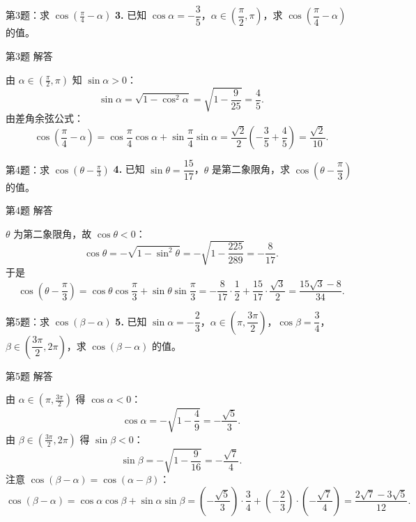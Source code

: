 \documentclass[10pt,aspectratio=169,serif]{beamer}
\begin{document}
\begin{frame}[t]{第3题：求 $\cos\!\left(\frac{\pi}{4}-\alpha\right)$}
\textbf{3.} 已知 $\cos\alpha=-\dfrac{3}{5}$，$\alpha\in\left(\dfrac{\pi}{2},\pi\right)$，求 $\cos\!\left(\dfrac{\pi}{4}-\alpha\right)$ 的值。
\end{frame}

\begin{frame}[t]{第3题 解答}
\begin{tcolorbox}[colback=orange!10,colframe=orange,title=\textbf{解}]
由 $\alpha\in(\frac{\pi}{2},\pi)$ 知 $\sin\alpha>0$：
\[
\sin\alpha=\sqrt{1-\cos^2\alpha}=\sqrt{1-\frac{9}{25}}=\frac45.
\]
由差角余弦公式：
\[
\cos\!\left(\frac{\pi}{4}-\alpha\right)
=\cos\frac{\pi}{4}\cos\alpha+\sin\frac{\pi}{4}\sin\alpha
=\frac{\sqrt2}{2}\!\left(-\frac35+\frac45\right)=\frac{\sqrt2}{10}.
\]
\end{tcolorbox}
\end{frame}

\begin{frame}[t]{第4题：求 $\cos\!\left(\theta-\frac{\pi}{3}\right)$}
\textbf{4.} 已知 $\sin\theta=\dfrac{15}{17}$，$\theta$ 是第二象限角，求 $\cos\!\left(\theta-\dfrac{\pi}{3}\right)$ 的值。
\end{frame}

\begin{frame}[t]{第4题 解答}
\begin{tcolorbox}[colback=orange!10,colframe=orange,title=\textbf{解}]
$\theta$ 为第二象限角，故 $\cos\theta<0$：
\[
\cos\theta=-\sqrt{1-\sin^2\theta}=-\sqrt{1-\frac{225}{289}}=-\frac8{17}.
\]
于是
\[
\cos\!\left(\theta-\frac{\pi}{3}\right)
=\cos\theta\cos\frac{\pi}{3}+\sin\theta\sin\frac{\pi}{3}
=-\frac8{17}\cdot\frac12+\frac{15}{17}\cdot\frac{\sqrt3}{2}
=\frac{15\sqrt3-8}{34}.
\]
\end{tcolorbox}
\end{frame}

\begin{frame}[t]{第5题：求 $\cos(\beta-\alpha)$}
\textbf{5.} 已知 $\sin\alpha=-\dfrac{2}{3}$，$\alpha\in\left(\pi,\dfrac{3\pi}{2}\right)$，$\cos\beta=\dfrac{3}{4}$，$\beta\in\left(\dfrac{3\pi}{2},2\pi\right)$，求 $\cos(\beta-\alpha)$ 的值。
\end{frame}

\begin{frame}[t]{第5题 解答}
\begin{tcolorbox}[colback=orange!10,colframe=orange,title=\textbf{解}]
由 $\alpha\in(\pi,\frac{3\pi}{2})$ 得 $\cos\alpha<0$：
\[
\cos\alpha=-\sqrt{1-\frac49}=-\frac{\sqrt5}{3}.
\]
由 $\beta\in(\frac{3\pi}{2},2\pi)$ 得 $\sin\beta<0$：
\[
\sin\beta=-\sqrt{1-\frac9{16}}=-\frac{\sqrt7}{4}.
\]
注意 $\cos(\beta-\alpha)=\cos(\alpha-\beta)$：
\[
\cos(\beta-\alpha)=\cos\alpha\cos\beta+\sin\alpha\sin\beta
=\!\left(-\frac{\sqrt5}{3}\right)\!\cdot\frac34+\!\left(-\frac23\right)\!\cdot\!\left(-\frac{\sqrt7}{4}\right)
=\frac{2\sqrt7-3\sqrt5}{12}.
\]
\end{tcolorbox}
\end{frame}
\end{document}
